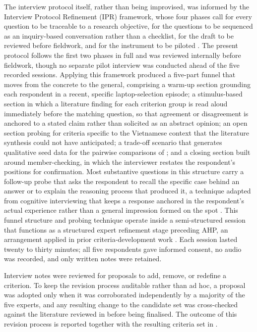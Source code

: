 The interview protocol itself, rather than being improvised, was informed by the Interview
Protocol Refinement (IPR) framework, whose four phases call for every question to be
traceable to a research objective, for the questions to be sequenced as an inquiry-based
conversation rather than a checklist, for the draft to be reviewed before fieldwork, and
for the instrument to be piloted \parencite{castillo-montoya_preparing_2016}. The present
protocol follows the first two phases in full and was reviewed internally before
fieldwork, though no separate pilot interview was conducted ahead of the five recorded
sessions. Applying this framework produced a five-part funnel that moves from the concrete
to the general, comprising a
warm-up section grounding each respondent in a recent, specific laptop-selection episode; a
stimulus-based section in which a literature finding for each criterion group is read
aloud immediately before the matching question, so that agreement or disagreement is
anchored to a stated claim rather than solicited as an abstract opinion; an open section
probing for criteria specific to the Vietnamese context that the literature synthesis
could not have anticipated; a trade-off scenario that generates qualitative seed data for
the pairwise comparisons of ; and a closing section built around
member-checking, in which the interviewer restates the respondent's positions for
confirmation. Most substantive questions in this structure carry a follow-up probe that
asks the respondent to recall the specific case behind an answer or to explain the
reasoning process that produced it, a technique adapted from cognitive interviewing that
keeps a response anchored in the respondent's actual experience rather than a general
impression formed on the spot \parencite{willis_cognitive_2005}. This funnel structure and
probing technique operate inside a semi-structured session that functions as a structured
expert refinement stage preceding AHP, an arrangement applied in prior
criteria-development work \parencite{al_hazza_integrated_2022,mcmillan_how_2016}.
Each session lasted twenty to thirty minutes; all five respondents gave informed consent,
no audio was recorded, and only written notes were retained.

Interview notes were reviewed for proposals to add, remove, or redefine a criterion. To
keep the revision process auditable rather than ad hoc, a proposal was adopted only when it
was corroborated independently by a majority of the five experts, and any resulting change
to the candidate set was cross-checked against the literature reviewed in
 before being finalised. The outcome of this revision process is
reported together with the resulting criteria set in .

